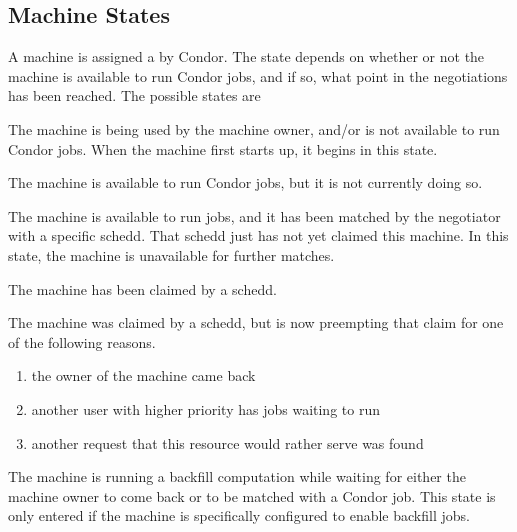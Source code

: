 \subsection{\label{sec:States} Machine States}

A machine is assigned a  by Condor.
The state
depends on whether or not the machine is available to run Condor
jobs, and if so, what point in the negotiations has been reached.
The possible states are

\begin{description}
  
\item[Owner] The machine is being used by the machine owner, and/or
  is not available to run Condor jobs.
  When the machine first starts up, it begins in this state.
  
\item[Unclaimed] The machine is available to run Condor jobs, but it is
  not currently doing so.
  
\item[Matched] The machine is available to run jobs, and it has been
  matched by the negotiator with a specific schedd.
  That schedd just has not yet claimed this machine.
  In this state, the machine is unavailable for further matches.

\item[Claimed] The machine has been claimed by a schedd. 
  
\item[Preempting] The machine was claimed by a schedd, but is now
  preempting that claim for one of the following reasons.
  \begin{enumerate}
  \item the owner of the machine came back
  \item another user with higher priority has jobs waiting to run
  \item another request that this resource would rather serve was found
  \end{enumerate}

\item[Backfill] The machine is running a backfill computation while
  waiting for either the machine owner to come back or to be matched
  with a Condor job.
  This state is only entered if the machine is specifically configured
  to enable backfill jobs.

\end{description}

